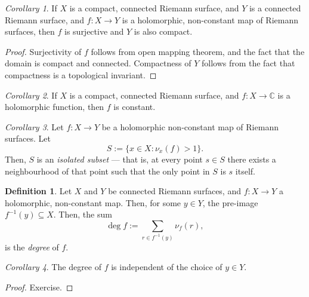 \documentclass[a4paper]{report}
\theoremstyle{definition}
\newtheorem{definition}{Definition}
\theoremstyle{remark}
\theoremstyle{proposition}
\theoremstyle{conjecture}
\theoremstyle{lemma}
\theoremstyle{corollary}
\newtheorem{corollary}{Corollary}
\theoremstyle{exercise}
\theoremstyle{example}
\newcommand{\C}{\mathbb{C}}
\begin{document}
\begin{corollary}
    If $X$ is a compact, connected Riemann surface, and $Y$ 
    is a connected Riemann surface, and $f: X \to Y$ is a holomorphic, 
    non-constant map of Riemann surfaces, 
    then $f$ is surjective and $Y$ is also compact.
\end{corollary}

\begin{proof}
    Surjectivity of $f$ follows from open mapping theorem, and the fact that 
    the domain is compact and connected. Compactness of $Y$ follows from the fact
    that compactness is a topological invariant.
\end{proof}

\begin{corollary}
    If $X$ is a compact, connected Riemann surface, and $f : X \to \C$ 
    is a holomorphic function, then $f$ is constant. 
\end{corollary}

\begin{corollary}
    Let $f : X \to Y$ be a holomorphic non-constant map of Riemann surfaces.
    Let $$S := \lbrace x \in X : \nu_x(f) > 1\rbrace.$$
    Then, $S$ is an \emph{isolated subset} --- that is, at every point $s\in S$ 
    there  exists a neighbourhood of that point such that the only point in 
    $S$ is $s$ itself.
\end{corollary}

%


\begin{definition}
    Let $X$ and $Y$ be connected Riemann surfaces, and $f : X\to Y$ 
    a holomorphic, non-constant map. Then, for some $y \in Y$,
    the pre-image $f^{-1}(y) \subseteq X$. Then,
    the sum $$\deg f :=\sum_{r\in f^{-1}(y)} \nu_f(r),$$
    is the \emph{degree} of $f$.
\end{definition}

\begin{corollary}
    The degree of $f$ is independent of the choice of $y\in Y$.
\end{corollary}

\begin{proof}
    Exercise.
\end{proof}
\end{document}
